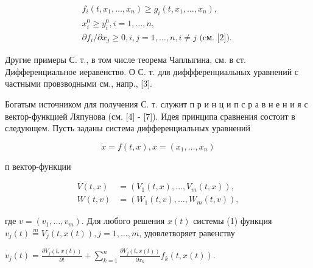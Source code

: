 \documentclass[10pt]{article}
\begin{document}
\[

\begin{gathered}

f_{i}\left(t, x_{1}, \ldots, x_{n}\right) \geqslant g_{i}\left(t, x_{1}, \ldots, x_{n}\right), \\

x_{i}^{0} \geqslant y_{i}^{0}, i=1, \ldots, n, \\

\partial f_{i} / \partial x_{j} \geqslant 0, i, j=1, \ldots, n, i \neq j \text { (cм. [2]). }

\end{gathered}

\]



Другие примеры С. т., в том числе теорема Чаплыгина, см. в ст. Дифференциальное иеравенство. О С. т. для диффференциальных уравнений с частными провзводными см., напр., [3].



Богатым источником для получения С. т. служит п р и н ц и п с р а в н е н и я с вектор-функцией Ляпунова (см. [4] - [7]). Идея принципа сравнения состоит в следующем. Пусть заданы система дифференциальных уравнений



\[

\dot{x}=f(t, x), x=\left(x_{1}, \ldots, x_{n}\right)

\]



п вектор-функции



\[

\begin{aligned}

V(t, x) & =\left(V_{1}(t, x), \ldots, V_{m}(t, x)\right), \\

W(t, v) & =\left(W_{1}(t, v), \ldots, W_{m}(t, v)\right),

\end{aligned}

\]



где $v=\left(v_{1}, \ldots, v_{m}\right)$. Для любого решения $x(t)$ системы (1) функция $v_{j}(t) \stackrel{m}{=} V_{j}(t, x(t)), j=1, \ldots, m$, удовлетворяет равенству



$\dot{v}_{j}(t)=\frac{\partial V_{j}(t, x(t))}{\partial t}+\sum_{k=1}^{n} \frac{\partial V_{j}(t, x(t))}{\partial x_{k}} f_{k}(t, x(t))$.
\end{document}
